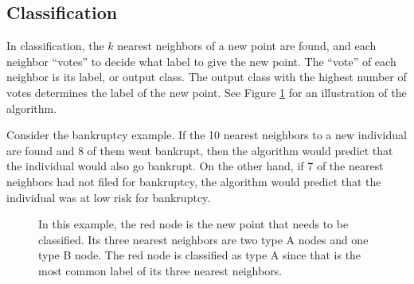 \subsection*{Classification}
In classification, the $k$ nearest neighbors of a new point are found, and each neighbor ``votes'' to decide what label to give the new point.
The ``vote'' of each neighbor is its label, or output class.
The output class with the highest number of votes determines the label of the new point.
See Figure \ref{fig:knn} for an illustration of the algorithm.

Consider the bankruptcy example.
If the 10 nearest neighbors to a new individual are found and 8 of them went bankrupt, then the algorithm would predict that the individual would also go bankrupt.
On the other hand, if 7 of the nearest neighbors had not filed for bankruptcy, the algorithm would predict that the individual was at low risk for bankruptcy.

\begin{figure}[h]
\begin{center}
\caption{In this example, the red node is the new point that needs to be classified. Its three nearest neighbors are two type A nodes and one type B node. The red node is classified as type A since that is the most common label of its three nearest neighbors.}
\label{fig:knn}
\end{center}
\end{figure}

